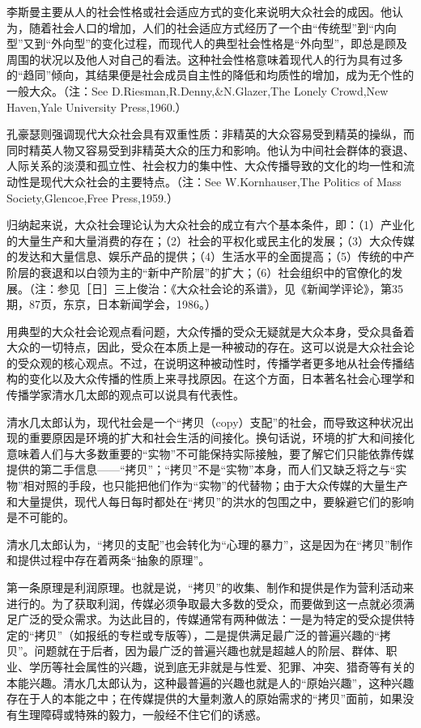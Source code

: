 \documentclass[UTF8,12pt]{ctexart}
\numberwithin{equation}{section} %
\numberwithin{figure}{section}
\numberwithin{table}{section}
\begin{document}
	李斯曼主要从人的社会性格或社会适应方式的变化来说明大众社会的成因。他认为，随着社会人口的增加，人们的社会适应方式经历了一个由“传统型”到“内向型”又到“外向型”的变化过程，而现代人的典型社会性格是“外向型”，即总是顾及周围的状况以及他人对自己的看法。这种社会性格意味着现代人的行为具有过多的“趋同”倾向，其结果便是社会成员自主性的降低和均质性的增加，成为无个性的一般大众。（注：See D.Riesman,R.Denny,\&N.Glazer,The Lonely Crowd,New Haven,Yale University Press,1960.）
	
	孔豪瑟则强调现代大众社会具有双重性质：非精英的大众容易受到精英的操纵，而同时精英人物又容易受到非精英大众的压力和影响。他认为中间社会群体的衰退、人际关系的淡漠和孤立性、社会权力的集中性、大众传播导致的文化的均一性和流动性是现代大众社会的主要特点。（注：See W.Kornhauser,The Politics of Mass Society,Glencoe,Free Press,1959.）
	
	归纳起来说，大众社会理论认为大众社会的成立有六个基本条件，即：（1）产业化的大量生产和大量消费的存在；（2）社会的平权化或民主化的发展；（3）大众传媒的发达和大量信息、娱乐产品的提供；（4）生活水平的全面提高；（5）传统的中产阶层的衰退和以白领为主的“新中产阶层”的扩大；（6）社会组织中的官僚化的发展。（注：参见［日］三上俊治：《大众社会论的系谱》，见《新闻学评论》，第35期，87页，东京，日本新闻学会，1986。）
	
	
	用典型的大众社会论观点看问题，大众传播的受众无疑就是大众本身，受众具备着大众的一切特点，因此，受众在本质上是一种被动的存在。这可以说是大众社会论的受众观的核心观点。不过，在说明这种被动性时，传播学者更多地从社会传播结构的变化以及大众传播的性质上来寻找原因。在这个方面，日本著名社会心理学和传播学家清水几太郎的观点可以说具有代表性。
	
	清水几太郎认为，现代社会是一个“拷贝（copy）支配”的社会，而导致这种状况出现的重要原因是环境的扩大和社会生活的间接化。换句话说，环境的扩大和间接化意味着人们与大多数重要的“实物”不可能保持实际接触，要了解它们只能依靠传媒提供的第二手信息——“拷贝”；“拷贝”不是“实物”本身，而人们又缺乏将之与“实物”相对照的手段，也只能把他们作为“实物”的代替物；由于大众传媒的大量生产和大量提供，现代人每日每时都处在“拷贝”的洪水的包围之中，要躲避它们的影响是不可能的。
	
	清水几太郎认为，“拷贝的支配”也会转化为“心理的暴力”，这是因为在“拷贝”制作和提供过程中存在着两条“抽象的原理”。
	
	第一条原理是利润原理。也就是说，“拷贝”的收集、制作和提供是作为营利活动来进行的。为了获取利润，传媒必须争取最大多数的受众，而要做到这一点就必须满足广泛的受众需求。为达此目的，传媒通常有两种做法：一是为特定的受众提供特定的“拷贝”（如报纸的专栏或专版等），二是提供满足最广泛的普遍兴趣的“拷贝”。问题就在于后者，因为最广泛的普遍兴趣也就是超越人的阶层、群体、职业、学历等社会属性的兴趣，说到底无非就是与性爱、犯罪、冲突、猎奇等有关的本能兴趣。清水几太郎认为，这种最普遍的兴趣也就是人的“原始兴趣”，这种兴趣存在于人的本能之中；在传媒提供的大量刺激人的原始需求的“拷贝”面前，如果没有生理障碍或特殊的毅力，一般经不住它们的诱惑。
	
\end{document}
